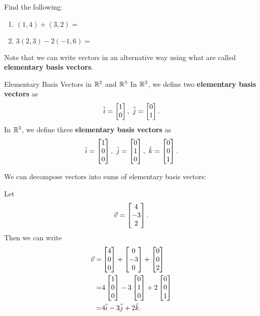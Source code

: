 \begin{exercise}{}
Find the following:
\begin{enumerate}
\item $(1,4)+(3,2)=$
\vspace{1em}
\item $3(2,3)-2(-1,6)=$
\end{enumerate}
\end{exercise}

Note that we can write vectors in an alternative way using what are called \textbf{elementary basis vectors}.

\begin{definition}{Elementary Basis Vectors in $\mathbb{R}^2$ and $\mathbb{R}^3$}
In $\mathbb{R}^2$, we define two \textbf{elementary basis vectors} as $$\hat{i}=\bmat{1\\0},\ \hat{j}=\bmat{0\\1}.$$
In $\mathbb{R}^3$, we define three \textbf{elementary basis vectors} as $$\hat{i}=\bmat{1\\0\\0},\ \hat{j}=\bmat{0\\1\\0},\ \hat{k}=\bmat{0\\0\\1}. $$
\end{definition}

We can decompose vectors into sums of elementary basis vectors:

\begin{example}{}
Let $$\vec{v}=\begin{bmatrix}4\\-3\\2\end{bmatrix}.$$ Then we can write 
\begin{align*}
\vec{v}=&\begin{bmatrix}4\\0\\0\end{bmatrix}+\begin{bmatrix}0\\-3\\0\end{bmatrix}+\begin{bmatrix}0\\0\\2\end{bmatrix}\\
=&4\begin{bmatrix}1\\0\\0\end{bmatrix}-3\begin{bmatrix}0\\1\\0\end{bmatrix}+2\begin{bmatrix}0\\0\\1\end{bmatrix}\\
=&4\hat{i}-3\hat{j}+2\hat{k}.
\end{align*}
\end{example}
